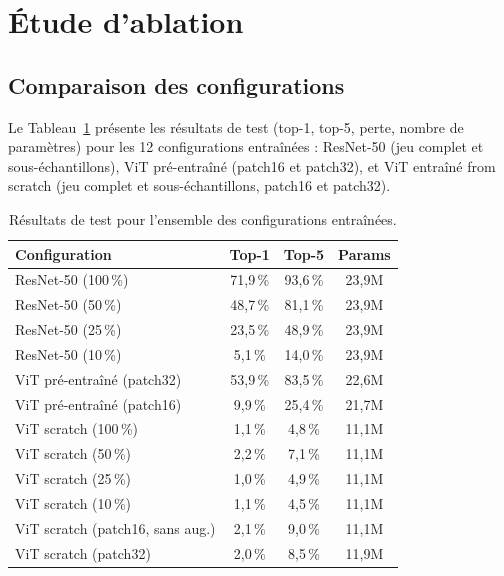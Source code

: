 \section{Étude d'ablation}
\label{sec:ablation}

\subsection{Comparaison des configurations}

Le Tableau~\ref{tab:ablation} présente les résultats de test (top-1,
top-5, perte, nombre de paramètres) pour les 12 configurations
entraînées : ResNet-50 (jeu complet et sous-échantillons), ViT
pré-entraîné (patch16 et patch32), et ViT entraîné from scratch (jeu
complet et sous-échantillons, patch16 et patch32).

\begin{table}[t]
  \centering
  \caption{Résultats de test pour l'ensemble des configurations entraînées.}
  \label{tab:ablation}
  \small
  \begin{tabular}{lccc}
    \toprule
    Configuration & Top-1 & Top-5 & Params \\
    \midrule
    ResNet-50 (100\,\%)          & 71{,}9\,\% & 93{,}6\,\% & 23{,}9M \\
    ResNet-50 (50\,\%)           & 48{,}7\,\% & 81{,}1\,\% & 23{,}9M \\
    ResNet-50 (25\,\%)           & 23{,}5\,\% & 48{,}9\,\% & 23{,}9M \\
    ResNet-50 (10\,\%)           & 5{,}1\,\%  & 14{,}0\,\% & 23{,}9M \\
    \midrule
    ViT pré-entraîné (patch32)   & 53{,}9\,\% & 83{,}5\,\% & 22{,}6M \\
    ViT pré-entraîné (patch16)   & 9{,}9\,\%  & 25{,}4\,\% & 21{,}7M \\
    \midrule
    ViT scratch (100\,\%)        & 1{,}1\,\%  & 4{,}8\,\%  & 11{,}1M \\
    ViT scratch (50\,\%)         & 2{,}2\,\%  & 7{,}1\,\%  & 11{,}1M \\
    ViT scratch (25\,\%)         & 1{,}0\,\%  & 4{,}9\,\%  & 11{,}1M \\
    ViT scratch (10\,\%)         & 1{,}1\,\%  & 4{,}5\,\%  & 11{,}1M \\
    ViT scratch (patch16, sans aug.) & 2{,}1\,\% & 9{,}0\,\% & 11{,}1M \\
    ViT scratch (patch32)        & 2{,}0\,\%  & 8{,}5\,\%  & 11{,}9M \\
    \bottomrule
  \end{tabular}
\end{table}

